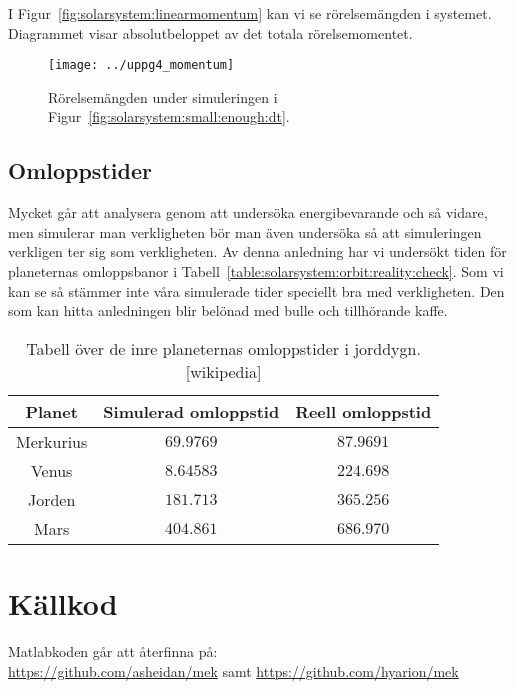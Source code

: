 \documentclass[a4]{article}
\begin{document}
I Figur~\vref{fig:solarsystem:linearmomentum} kan vi se rörelsemängden i systemet.
Diagrammet visar absolutbeloppet av det totala rörelsemomentet.
\begin{figure}
\begin{center}
	\texttt{[image: ../uppg4\_momentum]}
\end{center}
\caption{Rörelsemängden under simuleringen i Figur~\vref{fig:solarsystem:small:enough:dt}.}
\label{fig:solarsystem:linearmomentum}
\end{figure}


		\subsection{Omloppstider}
Mycket går att analysera genom att undersöka energibevarande och så vidare, men
simulerar man verkligheten bör man även undersöka så att simuleringen verkligen
ter sig som verkligheten.
Av denna anledning har vi undersökt tiden för planeternas omloppsbanor i
Tabell~\vref{table:solarsystem:orbit:reality:check}.
Som vi kan se så stämmer inte våra simulerade tider speciellt bra med
verkligheten.
Den som kan hitta anledningen blir belönad med bulle och tillhörande kaffe.

\begin{table}
\begin{center}
\begin{tabular}{c|c|c}
	Planet    & Simulerad omloppstid & Reell omloppstid \\
	\hline
	Merkurius & $69.9769$ &  $87.9691$ \\
	Venus     & $8.64583$ &  $224.698$ \\ 
	Jorden    & $181.713$ &  $365.256$ \\
	Mars      & $404.861$ &  $686.970$
\end{tabular}
\caption{
	Tabell över de inre planeternas omloppstider i jorddygn.[wikipedia]
}
\label{table:solarsystem:orbit:reality:check}
\end{center}
\end{table}

\section{Källkod}
	Matlabkoden går att återfinna på:\\
	\url{https://github.com/asheidan/mek} samt
	\url{https://github.com/hyarion/mek}
	
\end{document}
